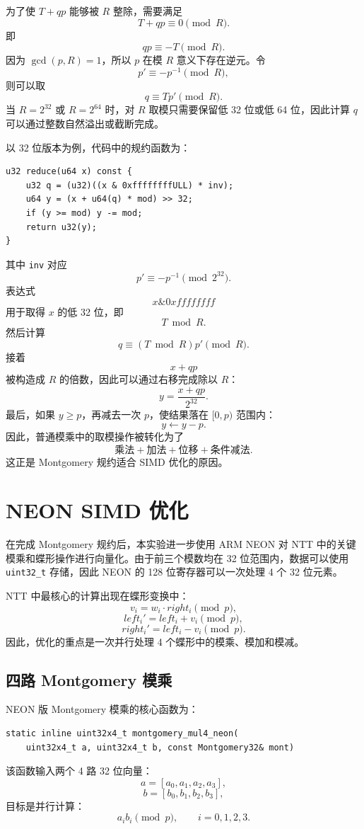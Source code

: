 \documentclass[a4paper]{article}
\begin{document}
为了使 \(T+qp\) 能够被 \(R\) 整除，需要满足
\[
T+qp\equiv 0\pmod R.
\]
即
\[
qp\equiv -T\pmod R.
\]
因为 \(\gcd(p,R)=1\)，所以 \(p\) 在模 \(R\) 意义下存在逆元。令
\[
p'\equiv -p^{-1}\pmod R,
\]
则可以取
\[
q\equiv Tp'\pmod R.
\]
当 \(R=2^{32}\) 或 \(R=2^{64}\) 时，对 \(R\) 取模只需要保留低 32 位或低 64 位，因此计算 \(q\) 可以通过整数自然溢出或截断完成。

以 32 位版本为例，代码中的规约函数为：
\begin{lstlisting}
u32 reduce(u64 x) const {
    u32 q = (u32)((x & 0xffffffffULL) * inv);
    u64 y = (x + u64(q) * mod) >> 32;
    if (y >= mod) y -= mod;
    return u32(y);
}
\end{lstlisting}
其中 \texttt{inv} 对应
\[
p'\equiv -p^{-1}\pmod {2^{32}}.
\]
表达式
\[
x \& 0xffffffff
\]
用于取得 \(x\) 的低 32 位，即
\[
T\bmod R.
\]
然后计算
\[
q\equiv (T\bmod R)p'\pmod R.
\]
接着
\[
x+qp
\]
被构造成 \(R\) 的倍数，因此可以通过右移完成除以 \(R\)：
\[
y=\frac{x+qp}{2^{32}}.
\]
最后，如果 \(y\ge p\)，再减去一次 \(p\)，使结果落在 \([0,p)\) 范围内：
\[
y\leftarrow y-p.
\]
因此，普通模乘中的取模操作被转化为了
\[
\text{乘法}+\text{加法}+\text{位移}+\text{条件减法}.
\]
这正是 Montgomery 规约适合 SIMD 优化的原因。

\section{NEON SIMD 优化}

在完成 Montgomery 规约后，本实验进一步使用 ARM NEON 对 NTT 中的关键模乘和蝶形操作进行向量化。由于前三个模数均在 32 位范围内，数据可以使用 \texttt{uint32\_t} 存储，因此 NEON 的 128 位寄存器可以一次处理 4 个 32 位元素。

NTT 中最核心的计算出现在蝶形变换中：
\[
v_i=w_i\cdot right_i\pmod p,
\]
\[
left_i'=left_i+v_i\pmod p,
\]
\[
right_i'=left_i-v_i\pmod p.
\]
因此，优化的重点是一次并行处理 4 个蝶形中的模乘、模加和模减。

\subsection{四路 Montgomery 模乘}

NEON 版 Montgomery 模乘的核心函数为：
\begin{lstlisting}
static inline uint32x4_t montgomery_mul4_neon(
    uint32x4_t a, uint32x4_t b, const Montgomery32& mont)
\end{lstlisting}

该函数输入两个 4 路 32 位向量：
\[
a=[a_0,a_1,a_2,a_3],
\]
\[
b=[b_0,b_1,b_2,b_3],
\]
目标是并行计算：
\[
a_i b_i \pmod p,\qquad i=0,1,2,3.
\]
\end{document}

